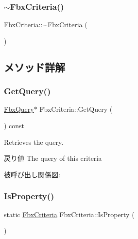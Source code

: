 \mbox{\label{class_fbx_criteria_a02a46eab5950a5b6a5059e2db3328713}} 
\subsubsection{\texorpdfstring{$\sim$\+Fbx\+Criteria()}{~FbxCriteria()}}
{\footnotesize\ttfamily Fbx\+Criteria\+::$\sim$\+Fbx\+Criteria (\begin{DoxyParamCaption}{ }\end{DoxyParamCaption})}



\subsection{メソッド詳解}
\mbox{\label{class_fbx_criteria_ac91d0ae92b399ad78114d851d08cd850}} 
\subsubsection{\texorpdfstring{Get\+Query()}{GetQuery()}}
{\footnotesize\ttfamily \hyperlink{class_fbx_query}{Fbx\+Query}$\ast$ Fbx\+Criteria\+::\+Get\+Query (\begin{DoxyParamCaption}{ }\end{DoxyParamCaption}) const}

Retrieves the query. \begin{DoxyReturn}{戻り値}
The query of this criteria 
\end{DoxyReturn}
被呼び出し関係図\+:
\mbox{\label{class_fbx_criteria_abe944a4f8d41017f7043b4855f03d20e}} 
\subsubsection{\texorpdfstring{Is\+Property()}{IsProperty()}}
{\footnotesize\ttfamily static \hyperlink{class_fbx_criteria}{Fbx\+Criteria} Fbx\+Criteria\+::\+Is\+Property (\begin{DoxyParamCaption}{ }\end{DoxyParamCaption})\hspace{0.3cm}{\ttfamily [static]}}



